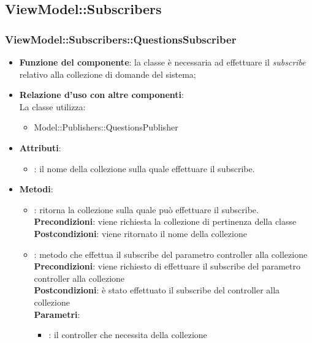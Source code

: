 \subsection{ViewModel::Subscribers}
\subsubsection{ViewModel::Subscribers::QuestionsSubscriber}
\begin{itemize}
\item\textbf{Funzione del componente}: la classe è necessaria ad effettuare il \emph{subscribe} relativo alla collezione di domande del sistema;
	\item\textbf{Relazione d'uso con altre componenti}: \\
La classe utilizza:
	\begin{itemize}
		\item Model::Publishers::QuestionsPublisher	
	\end{itemize}
\item\textbf{Attributi}:
	\begin{itemize}
		\item{}: il nome della collezione sulla quale effettuare il subscribe.\\	
	\end{itemize}
\item\textbf{Metodi}:
	\begin{itemize}
		\item{}: ritorna la collezione sulla quale può effettuare il subscribe.\\
		\textbf{Precondizioni}: viene richiesta la collezione di pertinenza della classe\\
		\textbf{Postcondizioni}: viene ritornato il nome della collezione\\
		\item{}: metodo che effettua il subscribe del parametro controller alla collezione\\
		\textbf{Precondizioni}: viene richiesto di effettuare il subscribe del parametro controller alla collezione\\
		\textbf{Postcondizioni}: è stato effettuato il subscribe del controller alla collezione\\
		\textbf{Parametri}:
			\begin{itemize}
				\item{}: il controller che necessita della collezione\\
			\end{itemize}
	\end{itemize}
\end{itemize}

